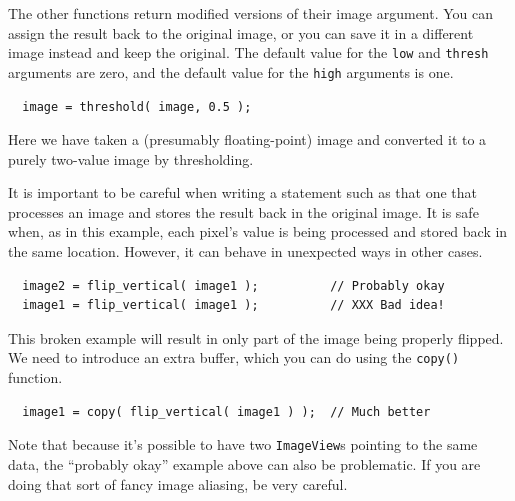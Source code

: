 The other functions return modified versions of their image argument.
You can assign the result back to the original image, or you can 
save it in a different image instead and keep the original.  The 
default value for the \verb#low# and \verb#thresh# arguments 
are zero, and the default value for the \verb#high# arguments is 
one.
\begin{verbatim}
  image = threshold( image, 0.5 );
\end{verbatim}
Here we have taken a (presumably floating-point) image and converted 
it to a purely two-value image by thresholding.

It is important to be careful when writing a statement such as that
one that processes an image and stores the result back in the original
image.  It is safe when, as in this example, each pixel's value is
being processed and stored back in the same location.  However, it can
behave in unexpected ways in other cases.
\begin{verbatim}
  image2 = flip_vertical( image1 );          // Probably okay
  image1 = flip_vertical( image1 );          // XXX Bad idea!
\end{verbatim}
This broken example will result in only part of the image being properly 
flipped.  We need to introduce an extra buffer, which you can do using 
the \verb#copy()# function.
\begin{verbatim}
  image1 = copy( flip_vertical( image1 ) );  // Much better
\end{verbatim}
Note that because it's possible to have two \verb#ImageView#s pointing 
to the same data, the ``probably okay'' example above can also be 
problematic.  If you are doing that sort of fancy image aliasing, be 
very careful.


